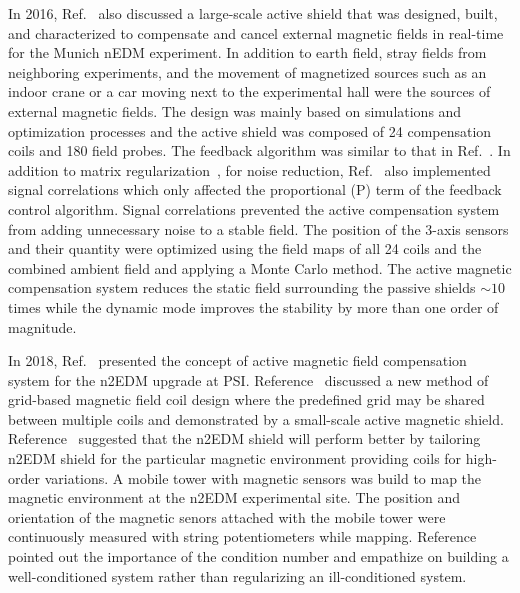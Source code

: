 In 2016, Ref.~\cite{lins} also discussed a large-scale active shield that was designed, built, and characterized to compensate and cancel external magnetic fields in real-time for the Munich nEDM experiment. In addition to earth field, stray fields from neighboring experiments, and the movement of magnetized sources such as an indoor crane or a car moving next to the experimental hall were the sources of external magnetic fields. The design was mainly based on simulations and optimization processes and the active shield was composed of 24 compensation coils and 180 field probes. The feedback algorithm was similar to that in Ref.~\cite{bea}. In addition to matrix regularization~\cite{bea}, for noise reduction, Ref.~\cite{lins} also implemented signal correlations which only affected the proportional (P) term of the feedback control algorithm. Signal correlations prevented the active compensation system from adding unnecessary noise to a stable field. The position of the 3-axis sensors and their quantity were optimized using the field maps of all 24 coils and the combined ambient field and applying a Monte Carlo method. The active magnetic compensation system reduces the static field surrounding the passive shields $\sim10$ times while the dynamic mode improves the stability by more than one order of magnitude.


In 2018, Ref.~\cite{rawlik} presented the concept of active magnetic field compensation system for the n2EDM upgrade at PSI. Reference~\cite{rawlik} discussed a new method of grid-based magnetic field coil design where the predefined grid may be shared between multiple coils and demonstrated by a small-scale active magnetic shield.   Reference~\cite{rawlik} suggested that the n2EDM shield will perform better by tailoring  n2EDM shield for the particular magnetic environment providing coils for high-order variations. A mobile tower with magnetic sensors was build to map the magnetic environment at the n2EDM experimental site. The position and orientation of the magnetic senors attached with the mobile tower were continuously measured with string potentiometers while mapping. Reference~\cite{rawlik} pointed out the importance of the condition number and empathize on building a well-conditioned system rather than regularizing an ill-conditioned system.



